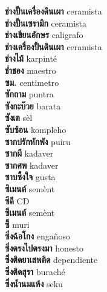 \textbf{ ช่างปั้นเครื่องดินเผา  } ceramista \\
\textbf{ ช่างปั้นเซรามิก  } ceramista \\
\textbf{ ช่างเขียนอักษร  } caligrafo \\
\textbf{ ช่างเครื่องปั้นดินเผา  } ceramista \\
\textbf{ ช่างไม้  } karpinté \\
\textbf{ ช่ำชอง  } maestro \\
\textbf{ ซม.  } centimetro \\
\textbf{ ซักถาม  } puntra \\
\textbf{ ซังกะบ๊วย  } barata \\
\textbf{ ซังเต  } sèl \\
\textbf{ ซับซ้อน  } kompleho \\
\textbf{ ซากปรักหักพัง  } puiru \\
\textbf{ ซากผี  } kadaver \\
\textbf{ ซากศพ  } kadaver \\
\textbf{ ซาบซึ้งใจ  } gusta \\
\textbf{ ซิเมนต์  } semènt \\
\textbf{ ซีดี  } CD \\
\textbf{ ซีเมนต์  } semènt \\
\textbf{ ซี้  } muri \\
\textbf{ ซึ่งฉ้อโกง  } engañoso \\
\textbf{ ซึ่งตรงไปตรงมา  } honesto \\
\textbf{ ซึ่งติดยาเสพติด  } dependiente \\
\textbf{ ซึ่งติดสุรา  } buraché \\
\textbf{ ซึ่งน้ำนมแห้ง  } seku \\
